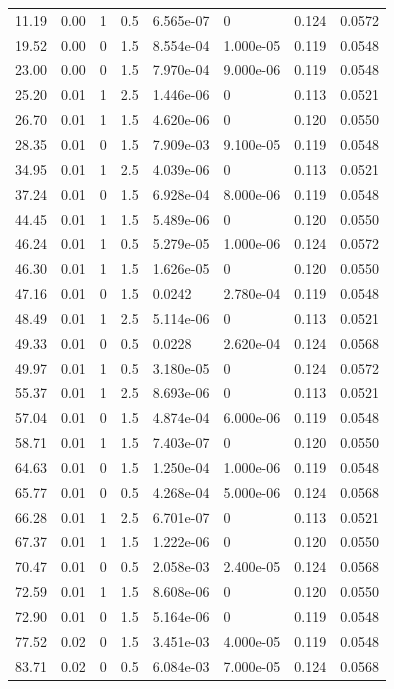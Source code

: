 \documentclass[preview]{standalone}
\begin{document}
{{\begin{tabular}{L{1.2cm}C{1.2cm} C{0.3cm}C{0.5cm} C{1.4cm}C{1.4cm} C{1.4cm}C{1.4cm}}
  11.19  &  0.00  & 1     & 0.5 &  6.565e-07  & 0  & 0.124 &  0.0572   \\ 
  19.52  &  0.00  & 0     & 1.5 &  8.554e-04  & 1.000e-05  & 0.119 &  0.0548   \\ 
  23.00  &  0.00  & 0     & 1.5 &  7.970e-04  & 9.000e-06  & 0.119 &  0.0548   \\ 
  25.20  &  0.01  & 1     & 2.5 &  1.446e-06  & 0  & 0.113 &  0.0521   \\ 
  26.70  &  0.01  & 1     & 1.5 &  4.620e-06  & 0  & 0.120 &  0.0550   \\ 
  28.35  &  0.01  & 0     & 1.5 &  7.909e-03  & 9.100e-05  & 0.119 &  0.0548   \\ 
  34.95  &  0.01  & 1     & 2.5 &  4.039e-06  & 0  & 0.113 &  0.0521   \\ 
  37.24  &  0.01  & 0     & 1.5 &  6.928e-04  & 8.000e-06  & 0.119 &  0.0548   \\ 
  44.45  &  0.01  & 1     & 1.5 &  5.489e-06  & 0  & 0.120 &  0.0550   \\ 
  46.24  &  0.01  & 1     & 0.5 &  5.279e-05  & 1.000e-06  & 0.124 &  0.0572   \\ 
  46.30  &  0.01  & 1     & 1.5 &  1.626e-05  & 0  & 0.120 &  0.0550   \\ 
  47.16  &  0.01  & 0     & 1.5 &  0.0242  & 2.780e-04  & 0.119 &  0.0548   \\ 
  48.49  &  0.01  & 1     & 2.5 &  5.114e-06  & 0  & 0.113 &  0.0521   \\ 
  49.33  &  0.01  & 0     & 0.5 &  0.0228  & 2.620e-04  & 0.124 &  0.0568   \\ 
  49.97  &  0.01  & 1     & 0.5 &  3.180e-05  & 0  & 0.124 &  0.0572   \\ 
  55.37  &  0.01  & 1     & 2.5 &  8.693e-06  & 0  & 0.113 &  0.0521   \\ 
  57.04  &  0.01  & 0     & 1.5 &  4.874e-04  & 6.000e-06  & 0.119 &  0.0548   \\ 
  58.71  &  0.01  & 1     & 1.5 &  7.403e-07  & 0  & 0.120 &  0.0550   \\ 
  64.63  &  0.01  & 0     & 1.5 &  1.250e-04  & 1.000e-06  & 0.119 &  0.0548   \\ 
  65.77  &  0.01  & 0     & 0.5 &  4.268e-04  & 5.000e-06  & 0.124 &  0.0568   \\ 
  66.28  &  0.01  & 1     & 2.5 &  6.701e-07  & 0  & 0.113 &  0.0521   \\ 
  67.37  &  0.01  & 1     & 1.5 &  1.222e-06  & 0  & 0.120 &  0.0550   \\ 
  70.47  &  0.01  & 0     & 0.5 &  2.058e-03  & 2.400e-05  & 0.124 &  0.0568   \\ 
  72.59  &  0.01  & 1     & 1.5 &  8.608e-06  & 0  & 0.120 &  0.0550   \\ 
  72.90  &  0.01  & 0     & 1.5 &  5.164e-06  & 0  & 0.119 &  0.0548   \\ 
  77.52  &  0.02  & 0     & 1.5 &  3.451e-03  & 4.000e-05  & 0.119 &  0.0548   \\ 
  83.71  &  0.02  & 0     & 0.5 &  6.084e-03  & 7.000e-05  & 0.124 &  0.0568   \\ 
\hline 
\end{tabular} 

}}
\end{document}
